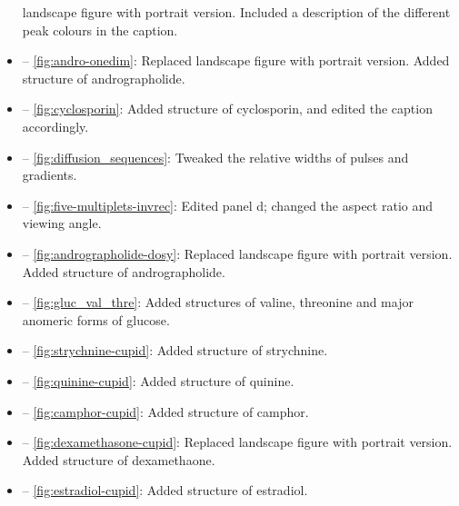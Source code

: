 \documentclass[12pt]{article}
\begin{document}
\begin{itemize}
            landscape figure with portrait version. Included a description of the
            different peak colours in the caption.
        \item {} -- \cref{fig:andro-onedim}: Replaced
            landscape figure with portrait version. Added structure of andrographolide.
        \item {} -- \cref{fig:cyclosporin}: Added structure of
            cyclosporin, and edited the caption accordingly.
        \item {} -- \cref{fig:diffusion_sequences}:
            Tweaked the relative widths of pulses and gradients.
        \item {} -- \cref{fig:five-multiplets-invrec}:
            Edited panel d; changed the aspect ratio and viewing angle.
        \item {} -- \cref{fig:andrographolide-dosy}:
            Replaced landscape figure with portrait version. Added structure of
            andrographolide.
        \item {} -- \cref{fig:gluc_val_thre}: Added
            structures of valine, threonine and major anomeric forms of glucose.
        \item {} -- \cref{fig:strychnine-cupid}: Added
            structure of strychnine.
        \item {} -- \cref{fig:quinine-cupid}: Added structure
            of quinine.
        \item {} -- \cref{fig:camphor-cupid}: Added structure
            of camphor.
        \item {} -- \cref{fig:dexamethasone-cupid}:
            Replaced landscape figure with portrait version. Added structure of
            dexamethaone.
        \item {} -- \cref{fig:estradiol-cupid}: Added
            structure of estradiol.
    \end{itemize}
\end{document}

